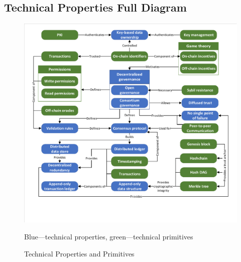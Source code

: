 \clearpage
\onecolumn
\appendix

\subsection{Technical Properties Full Diagram}


\begin{figure}[h]
	\centering
	\includegraphics[page=1,width=\columnwidth]{figures/grounded-theory-main}
	
	{\small Blue---technical properties, green---technical primitives}
	\caption{Technical Properties and Primitives}
	\label{fig:technical-properties-full}
\end{figure}